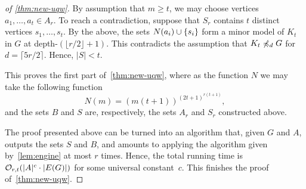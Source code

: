 \begin{proof}[of \cref{thm:new-uqw}]
By assumption that $m\ge t$, we may choose vertices $a_1,\ldots,a_t\in A_r$.
To reach a contradiction, suppose that $S_r$ contains $t$ distinct vertices $s_1,\ldots,s_t$. 
By the above, the sets $N(a_i)\cup\{s_i\}$ 
form a minor model of $K_t$ in $G$ at depth-$(\lfloor r/2\rfloor+1)$.
This contradicts the assumption that $K_t\not\preccurlyeq_d G$ for $d=\lceil 5r/2 \rceil$.
Hence, $|S|<t$.

This proves the first part of~\cref{thm:new-uqw}, where as the function $N$ we may take the following function
$$N(m)=(m(t+1))^{{(2t+1)}^{r(t+1)}},$$
and the sets $B$ and $S$ are, respectively, the sets $A_r$ and $S_r$ constructed above.

\medskip
The proof presented above can be turned into an algorithm that, 
given $G$ and $A$, outputs the sets $S$ and $B$, and amounts to
applying the algorithm given by~\cref{lem:engine} at most $r$ times.
Hence, the total running time is $\mathcal{O}_{r,t}(|A|^c\cdot |E(G)|)$ for some universal constant~$c$.
This finishes the proof of~\cref{thm:new-uqw}.
\end{proof}


